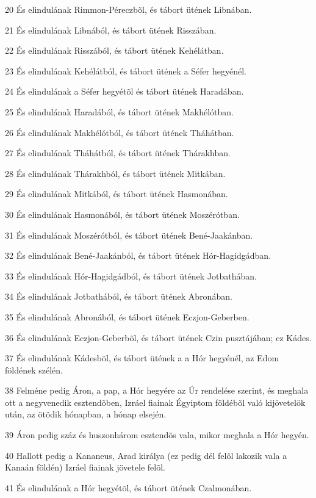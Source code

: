\par 20 És elindulának Rimmon-Péreczbõl, és tábort ütének Libnában.
\par 21 És elindulának Libnából, és tábort ütének Risszában.
\par 22 És elindulának Risszából, és tábort ütének Kehélátban.
\par 23 És elindulának Kehélátból, és tábort ütének a Séfer hegyénél.
\par 24 És elindulának a Séfer hegyétõl és tábort ütének Haradában.
\par 25 És elindulának Haradából, és tábort ütének Makhélótban.
\par 26 És elindulának Makhélótból, és tábort ütének Tháhátban.
\par 27 És elindulának Tháhátból, és tábort ütének Thárakhban.
\par 28 És elindulának Thárakhból, és tábort ütének Mitkában.
\par 29 És elindulának Mitkából, és tábort ütének Hasmonában.
\par 30 És elindulának Hasmonából, és tábort ütének Moszérótban.
\par 31 És elindulának Moszérótból, és tábort ütének Bené-Jaakánban.
\par 32 És elindulának Bené-Jaakánból, és tábort ütének Hór-Hagidgádban.
\par 33 És elindulának Hór-Hagidgádból, és tábort ütének Jotbathában.
\par 34 És elindulának Jotbathából, és tábort ütének Abronában.
\par 35 És elindulának Abronából, és tábort ütének Eczjon-Geberben.
\par 36 És elindulának Eczjon-Geberbõl, és tábort ütének Czin pusztájában; ez Kádes.
\par 37 És elindulának Kádesbõl, és tábort ütének a a Hór hegyénél, az Edom földének szélén.
\par 38 Felméne pedig Áron, a pap, a Hór hegyére az Úr rendelése szerint, és meghala ott a negyvenedik esztendõben, Izráel fiainak Égyiptom földébõl való kijövetelök után, az ötödik hónapban, a hónap elsején.
\par 39 Áron pedig száz és huszonhárom esztendõs vala, mikor meghala a Hór hegyén.
\par 40 Hallott pedig a Kananeus, Arad királya (ez pedig dél felõl lakozik vala a Kanaán földén) Izráel fiainak jövetele felõl.
\par 41 És elindulának a Hór hegyétõl, és tábort ütének Czalmonában.
